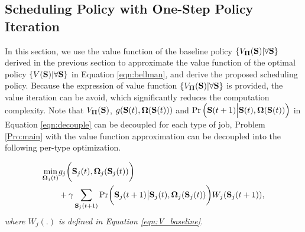 \subsection{Scheduling Policy with One-Step Policy Iteration}
In this section, we use the value function of the baseline policy $\{V_{\mathbf{\Pi}}(\mathbf{S})|\forall \mathbf{S}\}$ derived in the previous section to approximate the value function of the optimal policy $\{{V}(\mathbf{S})|\forall \mathbf{S}\}$ in Equation \eqref{eqn:bellman}, and derive the proposed scheduling policy. Because the expression of value function $\{V_{\mathbf{\Pi}}(\mathbf{S})|\forall \mathbf{S}\}$ is provided, the value iteration can be avoid, which significantly reduces the computation complexity. 
Note that $V_{\mathbf{\Pi}}(\mathbf{S})$, $g(\mathbf{S}(t),\boldsymbol{\Omega}(\mathbf{S}(t)))$ and $\Pr\Big(\mathbf{S}(t+1)\Big|\mathbf{S}(t),\boldsymbol{\Omega}(\mathbf{S}(t))\Big) $ in Equation \eqref{eqn:decouple} can be decoupled for each type of job, Problem \ref{Pro:main} with the value function approximation can be decoupled into the following per-type optimization.

\begin{problem}\label{Pro:sub-opt} \em
    \begin{align}
    \min_{\Policy_j(t)}&g_j\Paren{ \Stat_j(t),\Policy_j(\Stat_j(t)) }
    \nonumber\\
    &+\gamma \sum_{\Stat_j(t+1)}\Pr\Paren{ \Stat_j(t+1)\big|\Stat_j(t),\Policy_j(\Stat_j(t)) } W_{j}(\Stat_j(t+1)),
    \end{align}
where $W_{j}(.)$ is defined in Equation \eqref{eqn:V_baseline}.
\end{problem}

